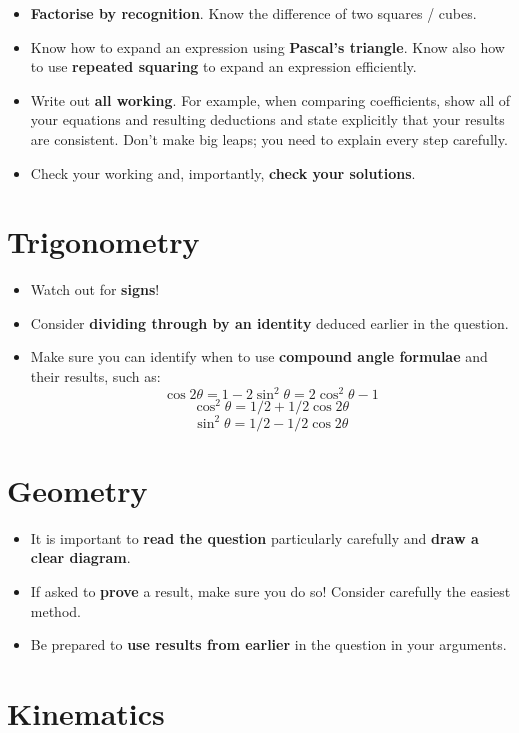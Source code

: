 \documentclass[9pt]{extarticle}
\begin{document}
	\begin{itemize}
		\item \textbf{Factorise by recognition}. Know the difference of two squares / cubes.
		\item Know how to expand an expression using \textbf{Pascal's triangle}. Know also how to use \textbf{repeated squaring} to expand an expression efficiently.
		\item Write out \textbf{all working}. For example, when comparing coefficients, show all of your equations and resulting deductions and state explicitly that your results are consistent. Don't make big leaps; you need to explain every step carefully.
		\item Check your working and, importantly, \textbf{check your solutions}.
	\end{itemize}
	
	\section{Trigonometry}
	
	\begin{itemize}
		\item Watch out for \textbf{signs}!
		\item Consider \textbf{dividing through by an identity} deduced earlier in the question.
		\item Make sure you can identify when to use \textbf{compound angle formulae} and their results, such as:
		$$\cos2\theta = 1-2\sin^2\theta = 2\cos^2\theta-1$$
		$$\cos^2\theta = 1/2 + 1/2\cos2\theta$$
		$$\sin^2\theta = 1/2 - 1/2\cos2\theta$$
	\end{itemize}
	
	\section{Geometry}
	
	\begin{itemize}
		\item It is important to \textbf{read the question} particularly carefully and \textbf{draw a clear diagram}.
		\item If asked to \textbf{prove} a result, make sure you do so! Consider carefully the easiest method.
		\item Be prepared to \textbf{use results from earlier} in the question in your arguments.
	\end{itemize}
	
	\section{Kinematics}
	
\end{document}

